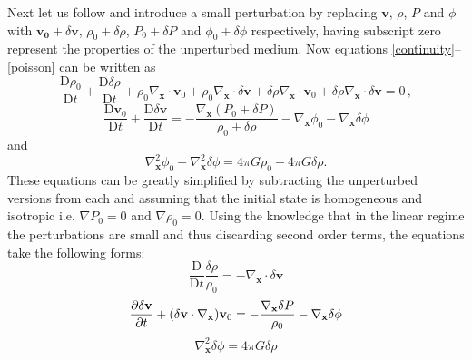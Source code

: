 \documentclass[english, twoside]{HYgradu}
\begin{document}
Next let us follow \citet{longair2008galaxy} and introduce a small perturbation by replacing $\mathbf{v}$, $\rho$, $P$ and $\phi$ with $\mathbf{v_0} + \delta\mathbf{v}$, $\rho_0 + \delta\rho$, $P_0 + \delta P$ and $\phi_0 + \delta \phi$ respectively, having subscript zero represent the properties of the unperturbed medium. Now equations \ref{continuity}--\ref{poisson} can be written as
\begin{equation}
\frac{\textrm{D}\rho_0}{\textrm{D}t} + \frac{\textrm{D}\delta\rho}{\textrm{D}t} + \rho_0 \nabla_\mathbf{x}\cdot{\mathbf{v}_0} + \rho_0 \nabla_\mathbf{x} \cdot\delta{\mathbf{v}} + \delta \rho \nabla_\mathbf{x} \cdot{\mathbf{v}}_0 + \delta\rho \nabla_\mathbf{x} \cdot\delta{\mathbf{v}}  = 0 \,,
\end{equation}
\begin{equation}
\frac{\textrm{D} \mathbf{v}_0}{\textrm{D}t} + \frac{\textrm{D} \delta\mathbf{v}}{\textrm{D}t}= - \frac{\nabla_\mathbf{x} (P_0 + \delta P)}{\rho_0 + \delta \rho} - \nabla_\mathbf{x}\phi_0 - \nabla_\mathbf{x}\delta\phi
\end{equation}
and
\begin{equation}
\nabla_\mathbf{x}^2\phi_0 + \nabla_\mathbf{x}^2\delta\phi = 4\pi G\rho_0 + 4\pi G\delta\rho.
\end{equation}
These equations can be greatly simplified by subtracting the unperturbed versions from each and assuming that the initial state is homogeneous and isotropic i.e. $\nabla P_0=0$ and $\nabla \rho_0 = 0$. Using the knowledge that in the linear regime the perturbations are small and thus discarding second order terms, the equations take the following forms:
\begin{equation}
\frac{\textrm{D}}{\textrm{D}t} \frac{\delta \rho}{\rho_0} = -\nabla_\mathbf{x} \cdot \delta \mathbf{v}
\end{equation}
\begin{equation}
\pdv{\delta \mathbf{v}}{t} + (\delta \mathbf{v} \cdot \nabla_\mathbf{x}) \mathbf{v}_0 = - \frac{\nabla_\mathbf{x} \delta P}{\rho_0} - \nabla_\mathbf{x} \delta \phi
\end{equation}
\begin{equation}
\nabla_\mathbf{x}^2\delta \phi = 4 \pi G \delta \rho
\end{equation}
\end{document}
